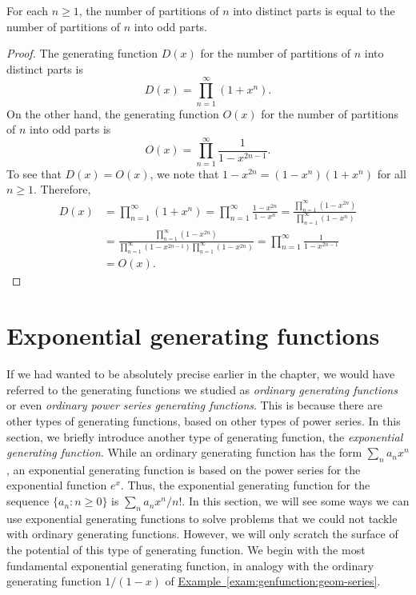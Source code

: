 \begin{theorem}\label{thm:partition}
For each $n\ge1$, the number of partitions of $n$ into distinct parts is
equal to the number of partitions of $n$ into odd parts.
\end{theorem}

\begin{proof}
The generating function $D(x)$ for
the number of partitions of $n$ into distinct parts is
\[
D(x)=\prod_{n=1}^\infty (1+x^n).
\]
On the other hand, the generating function $O(x)$ for the number of partitions
of $n$ into odd parts is
\[
O(x)=\prod_{n=1}^\infty\frac{1}{1-x^{2n-1}}.
\]
To see that $D(x)=O(x)$, we
note that $1-x^{2n}=(1-x^n)(1+x^n)$ for all $n\ge1$.  Therefore,
\begin{align*}
D(x)&=\prod_{n=1}^\infty
(1+x^n)=\prod_{n=1}^\infty\frac{1-x^{2n}}{1-x^n} =\frac{\prod_{n=1}^\infty(1-x^{2n})}{\prod_{n=1}^\infty(1-x^n)}\\
    &=\frac{\prod_{n=1}^\infty(1-x^{2n})}{
       \prod_{n=1}^\infty(1-x^{2n-1})\prod_{n=1}^\infty(1-x^{2n})}
    =\prod_{n=1}^\infty\frac{1}{1-x^{2n-1}}\\
    &= O(x).
\end{align*}
\end{proof}

\section{Exponential generating functions}\label{s:genfunction:exponential}

If we had wanted to be absolutely precise earlier in the chapter, we
would have referred to the generating functions we studied as
\emph{ordinary generating functions} or even \emph{ordinary power
  series generating functions}. This is because there are other types
of generating functions, based on other types of power series. In this
section, we briefly introduce another type of generating function, the
\emph{exponential generating function}. While an ordinary generating
function has the form $\sum_{n} a_n x^n$, an exponential generating
function is based on the power series for the exponential function
$e^x$. Thus, the exponential generating function for the sequence
$\{a_n\colon n\geq 0\}$ is $\sum_n a_n x^n/n!$. In this section, we
will see some ways we can use exponential generating functions to
solve problems that we could not tackle with ordinary generating
functions. However, we will only scratch the surface of the potential
of this type of generating function. We begin with the most
fundamental exponential generating function, in analogy with the
ordinary generating function $1/(1-x)$ of
\hyperref[exam:genfunction:geom-series]{Example~\ref*{exam:genfunction:geom-series}}.

